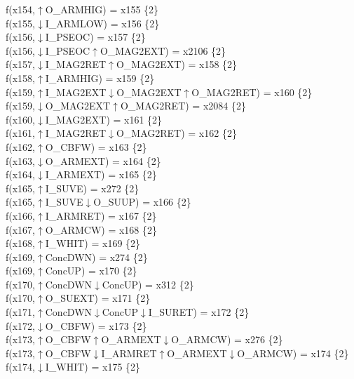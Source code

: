 f(x154,$\uparrow$O\_ARMHIG) = x155 \{2\} \\  
f(x155,$\downarrow$I\_ARMLOW) = x156 \{2\} \\  
f(x156,$\downarrow$I\_PSEOC) = x157 \{2\} \\  
f(x156,$\downarrow$I\_PSEOC$\uparrow$O\_MAG2EXT) = x2106 \{2\} \\  
f(x157,$\downarrow$I\_MAG2RET$\uparrow$O\_MAG2EXT) = x158 \{2\} \\  
f(x158,$\uparrow$I\_ARMHIG) = x159 \{2\} \\  
f(x159,$\uparrow$I\_MAG2EXT$\downarrow$O\_MAG2EXT$\uparrow$O\_MAG2RET) = x160 \{2\} \\  
f(x159,$\downarrow$O\_MAG2EXT$\uparrow$O\_MAG2RET) = x2084 \{2\} \\  
f(x160,$\downarrow$I\_MAG2EXT) = x161 \{2\} \\  
f(x161,$\uparrow$I\_MAG2RET$\downarrow$O\_MAG2RET) = x162 \{2\} \\  
f(x162,$\uparrow$O\_CBFW) = x163 \{2\} \\  
f(x163,$\downarrow$O\_ARMEXT) = x164 \{2\} \\  
f(x164,$\downarrow$I\_ARMEXT) = x165 \{2\} \\  
f(x165,$\uparrow$I\_SUVE) = x272 \{2\} \\  
f(x165,$\uparrow$I\_SUVE$\downarrow$O\_SUUP) = x166 \{2\} \\  
f(x166,$\uparrow$I\_ARMRET) = x167 \{2\} \\  
f(x167,$\uparrow$O\_ARMCW) = x168 \{2\} \\  
f(x168,$\uparrow$I\_WHIT) = x169 \{2\} \\  
f(x169,$\uparrow$ConcDWN) = x274 \{2\} \\  
f(x169,$\uparrow$ConcUP) = x170 \{2\} \\  
f(x170,$\uparrow$ConcDWN$\downarrow$ConcUP) = x312 \{2\} \\  
f(x170,$\uparrow$O\_SUEXT) = x171 \{2\} \\  
f(x171,$\uparrow$ConcDWN$\downarrow$ConcUP$\downarrow$I\_SURET) = x172 \{2\} \\  
f(x172,$\downarrow$O\_CBFW) = x173 \{2\} \\  
f(x173,$\uparrow$O\_CBFW$\uparrow$O\_ARMEXT$\downarrow$O\_ARMCW) = x276 \{2\} \\  
f(x173,$\uparrow$O\_CBFW$\downarrow$I\_ARMRET$\uparrow$O\_ARMEXT$\downarrow$O\_ARMCW) = x174 \{2\} \\  
f(x174,$\downarrow$I\_WHIT) = x175 \{2\} \\  
